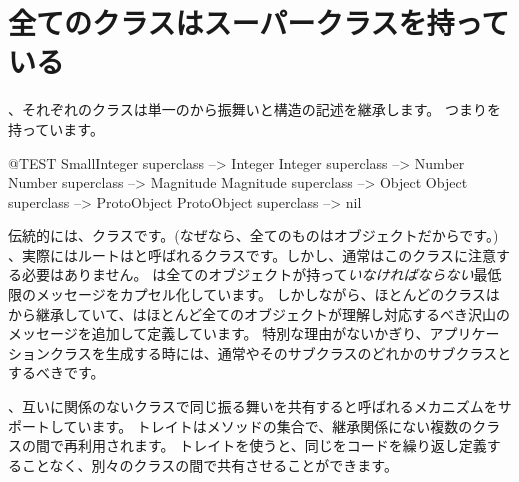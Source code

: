 \documentclass[a4paper,10pt,twoside]{book}
\begin{document}
\section{全てのクラスはスーパークラスを持っている}


、それぞれのクラスは単一のから振舞いと構造の記述を継承します。
つまりを持っています。

\begin{code}{@TEST}
SmallInteger superclass --> Integer
Integer superclass          --> Number
Number superclass        --> Magnitude
Magnitude superclass    --> Object
Object superclass           --> ProtoObject
ProtoObject superclass  --> nil
\end{code}

伝統的には、クラスです。(なぜなら、全てのものはオブジェクトだからです。)
、実際にはルートはと呼ばれるクラスです。しかし、通常はこのクラスに注意する必要はありません。
は全てのオブジェクトが持って\emph{いなければならない}最低限のメッセージをカプセル化しています。
しかしながら、ほとんどのクラスはから継承していて、はほとんど全てのオブジェクトが理解し対応するべき沢山のメッセージを追加して定義しています。
特別な理由がないかぎり、アプリケーションクラスを生成する時には、通常やそのサブクラスのどれかのサブクラスとするべきです。



、互いに関係のないクラスで同じ振る舞いを共有すると呼ばれるメカニズムをサポートしています。
トレイトはメソッドの集合で、継承関係にない複数のクラスの間で再利用されます。
トレイトを使うと、同じをコードを繰り返し定義することなく、別々のクラスの間で共有させることができます。

\end{document}
